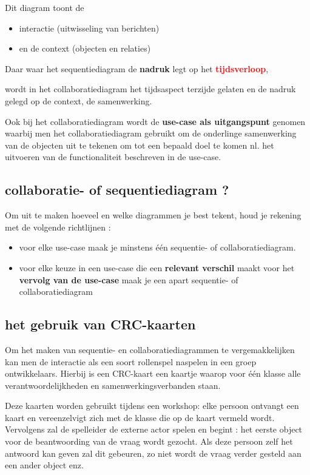 {Dit diagram toont de

\begin{itemize}
    \item interactie (uitwisseling van berichten)
    \item en de context (objecten en relaties)
\end{itemize}

Daar waar het sequentiediagram de \textbf{nadruk} legt op het \textcolor{red}{\textbf{tijdsverloop}}, 

wordt in het collaboratiediagram het tijdsaspect terzijde gelaten en de nadruk gelegd op de context, de samenwerking.

Ook bij het collaboratiediagram wordt de \textbf{use-case als uitgangspunt} genomen waarbij men het collaboratiediagram gebruikt om de onderlinge samenwerking van de objecten uit te tekenen om tot een bepaald doel te komen nl. het uitvoeren van de functionaliteit beschreven in de use-case.
\newpage
\subsection{collaboratie- of sequentiediagram ?}

Om uit te maken hoeveel en welke diagrammen je best tekent, houd je rekening met de volgende richtlijnen :

\begin{itemize}
    \item voor elke use-case maak je minstens één sequentie- of collaboratiediagram.
    \item voor elke keuze in een use-case die een \textbf{relevant verschil} maakt voor het\textbf{ vervolg van de use-case} maak je een apart sequentie- of collaboratiediagram
\end{itemize}

\subsection{het gebruik van CRC-kaarten}

Om het maken van sequentie- en collaboratiediagrammen te vergemakkelijken kan men de interactie als een soort rollenspel naspelen in een groep ontwikkelaars. Hierbij is een CRC-kaart een kaartje waarop voor één klasse alle verantwoordelijkheden en samenwerkingsverbanden staan.

Deze kaarten worden gebruikt tijdens een workshop: elke persoon ontvangt een kaart en vereenzelvigt zich met de klasse die op de kaart vermeld wordt. Vervolgens zal de spelleider de externe actor spelen en begint : het eerste object voor de beantwoording van de vraag wordt gezocht. Als deze persoon zelf het antwoord kan geven zal dit gebeuren, zo niet wordt de vraag verder gesteld aan een ander object enz.

}
